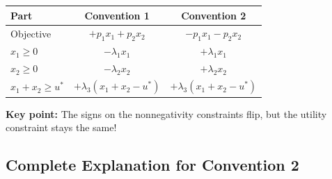 \documentclass[11pt]{article}
\begin{document}
\begin{center}
\begin{tabular}{|l|c|c|}
\hline
\textbf{Part} & \textbf{Convention 1} & \textbf{Convention 2} \\
\hline
Objective & $+p_1 x_1 + p_2 x_2$ & $-p_1 x_1 - p_2 x_2$ \\
\hline
$x_1 \geq 0$ & $-\lambda_1 x_1$ & $+\lambda_1 x_1$ \\
\hline
$x_2 \geq 0$ & $-\lambda_2 x_2$ & $+\lambda_2 x_2$ \\
\hline
$x_1 + x_2 \geq u^*$ & $+\lambda_3(x_1+x_2-u^*)$ & $+\lambda_3(x_1+x_2-u^*)$ \\
\hline
\end{tabular}
\end{center}

\textbf{Key point:} The signs on the nonnegativity constraints flip, but the utility constraint stays the same!

\subsection{Complete Explanation for Convention 2}
\end{document}
